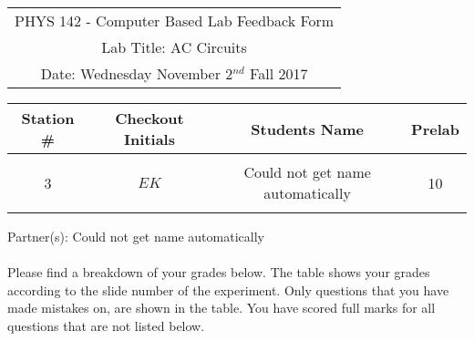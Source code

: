 \documentclass{article}
\begin{document}

\begin{table}[h]
	\centering
	\begin{tabular}{c}
	PHYS 142 - Computer Based Lab Feedback Form\\
	Lab Title: AC Circuits\\Date: Wednesday November 2$^{nd}$ Fall 2017 \\\hline
\end{tabular}
\end{table}
\begin{table}[h]\centering \begin{tabular}{|c|c|p{9.9 cm}|c|}\hline Station \#  & Checkout Initials & \multicolumn{1}{|c|}{Students Name} & Prelab \\\hline\multirow{3}{*}{3}& \multirow{3}{*}{$EK$} & &\\& &\multicolumn{1}{|c|}{Could not get name automatically}&10\\&   &  &\\\hline
\end{tabular}
\end{table}
Partner(s): Could not get name automatically\\
\\Please find a breakdown of your grades below. The table shows your grades according to the slide number of the experiment. Only questions that you have made mistakes on, are shown in the table. You have scored full marks for all questions that are not listed below.
\end{document}
